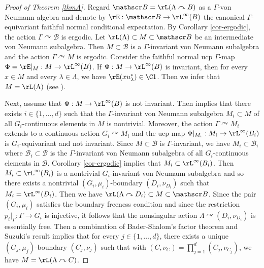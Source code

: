 \begin{proof}[Proof of Theorem \ref{thmA}]
Regard $\mathscr B = \rL(\Lambda \curvearrowright B)$ as a $\Gamma$-von Neumann algebra and denote by $\rE : \mathscr B \to \rL^\infty(B)$ the canonical $\Gamma$-equivariant faithful normal conditional expectation. By Corollary \ref{cor-ergodic}, the action $\Gamma \curvearrowright \mathscr B$ is ergodic. Let $\rL(\Lambda) \subset M \subset \mathscr B$ be an intermediate von Neumann subalgebra. Then $M \subset\mathscr B$ is a $\Gamma$-invariant von Neumann subalgebra and the action $\Gamma \curvearrowright M$ is ergodic. Consider the faithful normal ucp $\Gamma$-map $\Phi = \rE|_M : M \to \rL^\infty(B)$. If $\Phi : M \to \rL^\infty(B)$ is invariant, then for every $x \in M$ and every $\lambda \in \Lambda$, we have $\rE(x u_\lambda^*) \in \C 1$. Then we infer that $M = \rL(\Lambda)$ (see \eg \cite[Cor.\,3.4]{Su18}).

Next, assume that $\Phi : M \to \rL^\infty(B)$ is not invariant. Then \cite[Th.\,5.8]{BBHP20} implies that there exists $i \in \{1, \dots, d\}$ such that the $\Gamma$-invariant von Neumann subalgebra $M_i \subset M$ of all $G_i$-continuous elements in $M$ is nontrivial. Moreover, the action $\Gamma \curvearrowright M_i$ extends to a continuous action $G_i \curvearrowright M_i$ and the ucp map $\Phi|_{M_i} : M_i \to \rL^\infty(B_i)$ is $G_i$-equivariant and not invariant. Since $M \subset \mathscr B$ is $\Gamma$\nobreakdash-in\-vari\-ant, we have $M_i \subset \mathscr B_i$ where $\mathscr B_i \subset \mathscr B$ is the $\Gamma$-invariant von Neumann subalgebra of all $G_i$-continuous elements in $\mathscr B$. Corollary \ref{cor-ergodic} implies that $M_i \subset \rL^\infty(B_i)$. Then $M_i \subset \rL^\infty(B_i)$ is a nontrivial $G_i$-invariant von Neumann subalgebra and so there exists a nontrivial $(G_i, \mu_i)$-boundary $(D_i, \nu_{D_i})$ such that $M_i = \rL^\infty(D_i)$. Then we have $\rL(\Lambda \curvearrowright D_i) \subset M \subset \mathscr B$. Since the pair $(G_i, \mu_i)$ satisfies the boundary freeness condition and since the restriction $p_i |_\Gamma : \Gamma \to G_i$ is injective, it follows that the nonsingular action $\Lambda \curvearrowright (D_i, \nu_{D_i})$ is essentially free. Then a combination of Bader-Shalom's factor theorem \cite[Th.\,1.7]{BS04} and Suzuki's result \cite[Th.\,3.6]{Su18} implies that for every $j \in \{1, \dots, d\}$, there exists a unique $(G_j, \mu_j)$-boundary $(C_j, \nu_j)$ such that with $(C, \nu_C) = \prod_{j = 1}^d (C_j, \nu_{C_j})$, we have $M = \rL(\Lambda \curvearrowright C)$.
\end{proof}

